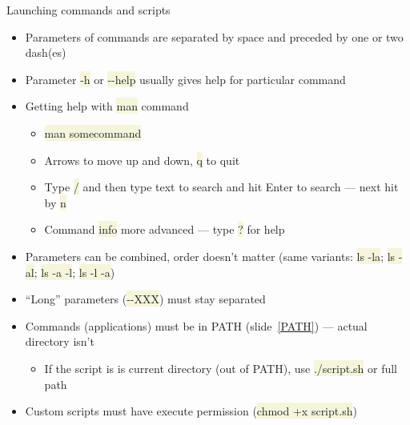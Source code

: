 \documentclass[compress, xelatex, 11pt, xcolor=svgnames, aspectratio=169, url={hyphens, lowtilde}]{beamer}
\renewcommand{\texttt}[1]{\colorbox{Beige}{{\ttfamily #1}}}
\begin{document}
\begin{frame}{Launching commands and scripts}
	\begin{itemize}
		\item Parameters of commands are separated by space and preceded by one or two dash(es)
		\item Parameter \texttt{-h} or \texttt{-{-}help} usually gives help for particular command
		\item Getting help with \texttt{man} command
		\begin{itemize}
			\item \texttt{man somecommand}
			\item Arrows to move up and down, \texttt{q} to quit
			\item Type \texttt{/} and then type text to search and hit Enter to search --- next hit by \texttt{n}
			\item Command \texttt{info} more advanced --- type \texttt{?} for help
		\end{itemize}
		\item Parameters can be combined, order doesn't matter (same variants: \texttt{ls -la}; \texttt{ls -al}; \texttt{ls -a -l}; \texttt{ls -l -a})
		\item \enquote{Long} parameters (\texttt{-{-}XXX}) must stay separated
		\item Commands (applications) must be in PATH (slide~\ref{PATH}) --- actual directory isn't
		\begin{itemize}
			\item If the script is is current directory (out of PATH), use \texttt{./script.sh} or full path
		\end{itemize}
		\item Custom scripts must have execute permission (\texttt{chmod +x script.sh})
	\end{itemize}
\end{frame}
\end{document}
